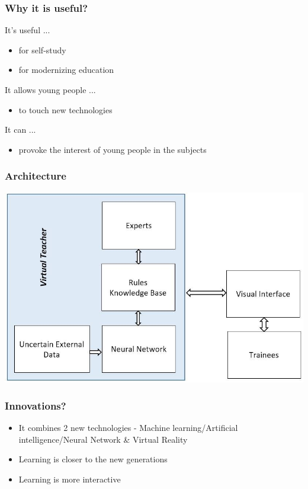 \documentclass[12pt]{beamer}
\begin{document}
	\begin{frame}
		\frametitle{Why it is useful?}
		\begin{block}{It's useful ...}
			\begin{itemize}
				\item for self-study
				\item for modernizing education
			\end{itemize}
		\end{block}
		\begin{block}{It allows young people ...}
			\begin{itemize}
				\item to touch new technologies
			\end{itemize}
		\end{block}
		\begin{block}{It can ...}
			\begin{itemize}
				\item provoke the interest of young people in the subjects
			\end{itemize}
		\end{block}
	\end{frame}
	\begin{frame}
		\frametitle{Architecture}
		\includegraphics[width=\textwidth]{schema.jpg}
	\end{frame}
	\begin{frame}
		\frametitle{Innovations?}
		\begin{itemize}
			\item It combines 2 new technologies - Machine learning/Artificial intelligence/Neural Network \& Virtual Reality
			\item Learning is closer to the new generations
			\item Learning is more interactive
		\end{itemize}
	\end{frame}
\end{document}
